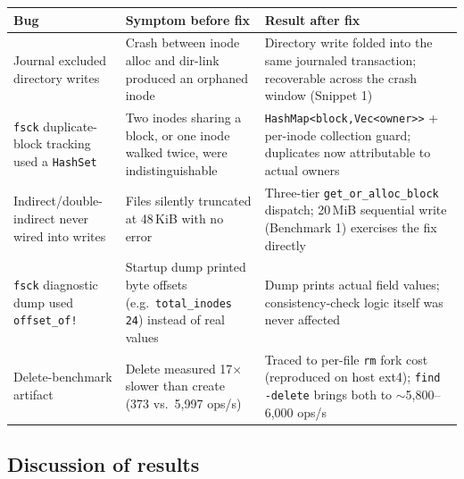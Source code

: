 \documentclass[11pt]{article}
\begin{document}
\begin{center}
\begin{tabular}{p{3.6cm}p{4.6cm}p{4.6cm}}
\toprule
\textbf{Bug} & \textbf{Symptom before fix} & \textbf{Result after fix} \\
\midrule
Journal excluded directory writes & Crash between inode alloc and dir-link produced an orphaned inode & Directory write folded into the same journaled transaction; recoverable across the crash window (Snippet 1) \\
\texttt{fsck} duplicate-block tracking used a \texttt{HashSet} & Two inodes sharing a block, or one inode walked twice, were indistinguishable & \texttt{HashMap<block,\allowbreak Vec<owner>>} + per-inode collection guard; duplicates now attributable to actual owners \\
Indirect/double-indirect never wired into writes & Files silently truncated at 48\,KiB with no error & Three-tier \texttt{get\_or\_alloc\_block} dispatch; 20\,MiB sequential write (Benchmark 1) exercises the fix directly \\
\texttt{fsck} diagnostic dump used \texttt{offset\_of!} & Startup dump printed byte offsets (e.g.\ \texttt{total\_inodes 24}) instead of real values & Dump prints actual field values; consistency-check logic itself was never affected \\
Delete-benchmark artifact & Delete measured 17$\times$ slower than create (373 vs.\ 5{,}997 ops/s) & Traced to per-file \texttt{rm} fork cost (reproduced on host ext4); \texttt{find -delete} brings both to $\sim$5{,}800--6{,}000 ops/s \\
\bottomrule
\end{tabular}
\end{center}

\subsection{Discussion of results}
\end{document}
